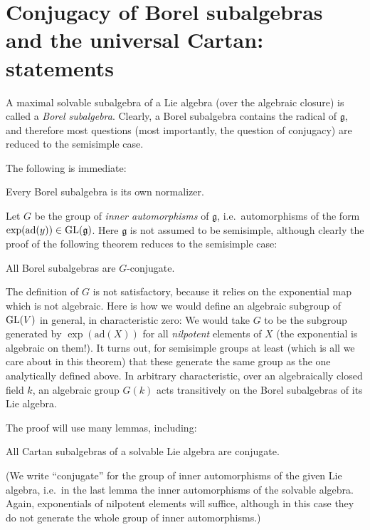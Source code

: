 \section{Conjugacy of Borel subalgebras and the universal Cartan: statements}


A maximal solvable subalgebra of a Lie algebra (over the algebraic closure) is called a \emph{Borel subalgebra}. Clearly, a Borel subalgebra contains the radical of $\mathfrak g$, and therefore most questions (most importantly, the question of conjugacy) are reduced to the semisimple case.

The following is immediate:
\begin{lemma}
 Every Borel subalgebra is its own normalizer.
\end{lemma}


Let $G$ be the group of \emph{inner automorphisms} of $\mathfrak g$, i.e.\ automorphisms of the form $\exp(\text{ad}(y))\in {\rm GL}(\mathfrak g)$. Here $\mathfrak g$ is not assumed to be semisimple, although clearly the proof of the following theorem reduces to the semisimple case:

\begin{theorem}
 All Borel subalgebras are $G$-conjugate.
\end{theorem}

\begin{remark}
 The definition of $G$ is not satisfactory, because it relies on the exponential map which is not algebraic. Here is how we would define an algebraic subgroup of ${\rm GL}(V)$ in general, in characteristic zero: We would take $G$ to be the subgroup generated by $\exp(\text{ad}(X))$ for all \emph{nilpotent} elements of $X$ (the exponential is algebraic on them!). It turns out, for semisimple groups at least (which is all we care about in this theorem) that these generate the same group as the one analytically defined above. In arbitrary characteristic, over an algebraically closed field $k$, an algebraic group $G(k)$ acts transitively on the Borel subalgebras of its Lie algebra. 
\end{remark}

The proof will use many lemmas, including:

\begin{lemma}
 All Cartan subalgebras of a solvable Lie algebra are conjugate.
\end{lemma}

(We write ``conjugate'' for the group of inner automorphisms of the given Lie algebra, i.e.\ in the last lemma the inner automorphisms of the solvable algebra. Again, exponentials of nilpotent elements will suffice, although in this case they do not generate the whole group of inner automorphisms.)


